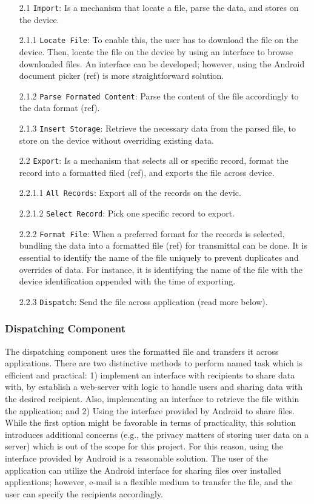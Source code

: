 \begin{itemize}
    \item[2.1] \verb|Import|: Is a mechanism that locate a file, parse the data, and stores on the device.
    \item[2.1.1] \verb|Locate File|: To enable this, the user has to download the file on the device. Then, locate the file on the device by using an interface to browse downloaded files. An interface can be developed; however, using the Android document picker (ref) is more straightforward solution.
    \item[2.1.2] \verb|Parse Formated Content|: Parse the content of the file accordingly to the data format (ref).
    \item[2.1.3] \verb|Insert Storage|: Retrieve the necessary data from the parsed file, to store on the device without overriding existing data.   
    \item[2.2] \verb|Export|: Is a mechanism that selects all or specific record, format the record into a formatted filed (ref), and exports the file across device. 
    \item[2.2.1.1] \verb|All Records|: Export all of the records on the devic.
    \item[2.2.1.2] \verb|Select Record|: Pick one specific record to export. 
    \item[2.2.2] \verb|Format File|: When a preferred format for the records is selected, bundling the data into a formatted file (ref) for transmittal can be done. It is essential to identify the name of the file uniquely to prevent duplicates and overrides of data. For instance, it is identifying the name of the file with the device identification appended with the time of exporting. 
    \item[2.2.3] \verb|Dispatch|: Send the file across application (read more below).
\end{itemize}

\subsubsection{Dispatching Component}
The dispatching component uses the formatted file and transfers it across applications. There are two distinctive methods to perform named task which is efficient and practical: 1) implement an interface with recipients to share data with, by establish a web-server with logic to handle users and sharing data with the desired recipient. Also, implementing an interface to retrieve the file within the application;  and 2) Using the interface provided by Android to share files. While the first option might be favorable in terms of practicality, this solution introduces additional concerns (e.g., the privacy matters of storing user data on a server) which is out of the scope for this project. For this reason, using the interface provided by Android is a reasonable solution. The user of the application can utilize the Android interface for sharing files over installed applications; however, e-mail is a flexible medium to transfer the file, and the user can specify the recipients accordingly.  


